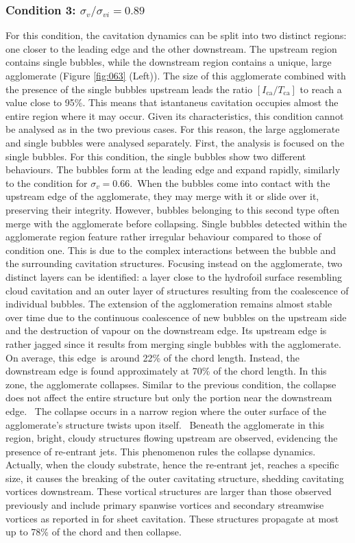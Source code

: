 \subsubsection{Condition 3: $\sigma_v/\sigma_{vi} = 0.89$}
\label{sez:stereo_3}
For this condition, the cavitation dynamics can be split into two distinct regions: one closer to the leading edge and the other downstream. 
The upstream region contains single bubbles, while the downstream region contains a unique, large agglomerate (Figure \ref{fig:063} (Left)).
The size of this agglomerate combined with the presence of the single bubbles upstream leads the ratio  $[I_{\text{ca}} / T_{\text{ca}}]$ to reach a value close to 95\%. This means that istantaneus cavitation occupies almost the entire region where it may occur. 
Given its characteristics, this condition cannot be analysed as in the two previous cases. For this reason, the large agglomerate and single bubbles were analysed separately.
First, the analysis is focused on the single bubbles. For this condition, the single bubbles show two different behaviours. The bubbles form at the leading edge and expand rapidly, similarly to the condition for $\sigma_v = 0.66$. When the bubbles come into contact with the upstream edge of the agglomerate, they may merge with it or slide over it, preserving their integrity. However, bubbles belonging to this second type often merge with the agglomerate before collapsing.
Single bubbles detected within the agglomerate region feature rather irregular behaviour compared to those of condition one. This is due to the complex interactions between the bubble and the surrounding cavitation structures.
Focusing instead on the agglomerate, two distinct layers can be identified: a layer close to the hydrofoil surface resembling cloud cavitation and an outer layer of structures resulting from the coalescence of individual bubbles. The extension of the agglomeration remains almost stable over time due to the continuous coalescence of new bubbles on the upstream side and the destruction of vapour on the downstream edge. Its upstream edge is rather jagged since it results from merging single bubbles with the agglomerate. On average, this edge is around 22\% of the chord length.
Instead, the downstream edge is found approximately at 70\%  of the chord length.
In this zone, the agglomerate collapses. Similar to the previous condition, the collapse does not affect the entire structure but only the portion near the downstream edge. 
The collapse occurs in a narrow region where the outer surface of the agglomerate's structure twists upon itself.  Beneath the agglomerate in this region, bright, cloudy structures flowing upstream are observed, evidencing the presence of re-entrant jets. This phenomenon rules the collapse dynamics. Actually, when the cloudy substrate, hence the re-entrant jet, reaches a specific size, it causes the breaking of the outer cavitating structure, shedding cavitating vortices downstream.
These vortical structures are larger than those observed previously and include primary spanwise vortices and secondary streamwise vortices as reported in \cite{Foeth2008} for sheet cavitation. These structures propagate at most up to 78\% of the chord and then collapse. 

